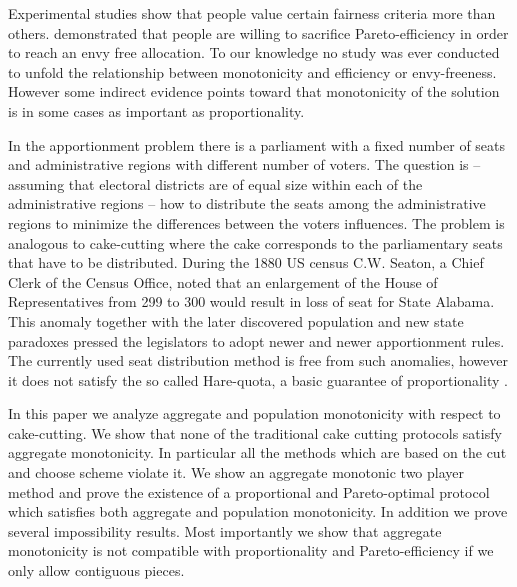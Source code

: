 \documentclass[a4paper,12pt]{article}
\begin{document}
Experimental studies show that people value certain fairness criteria more than others. \cite{Herreiner2009} demonstrated that people are willing to sacrifice Pareto-efficiency in order to reach an envy free allocation. To our knowledge no study was ever conducted to unfold the relationship between monotonicity and efficiency or envy-freeness. However some indirect evidence points toward that monotonicity of the solution is in some cases as important as proportionality. 

In the apportionment problem there is a parliament with a fixed number of seats and administrative regions with different number of voters. The question is -- assuming that electoral districts are of equal size within each of the administrative regions -- how to distribute the seats among the administrative regions to minimize the differences between the voters influences. The problem is analogous to cake-cutting where the cake corresponds to the parliamentary seats that have to be distributed. During the 1880 US census C.W. Seaton, a Chief Clerk of the Census Office, noted that an enlargement of the House of Representatives from 299 to 300 would result in loss of seat for State Alabama. This anomaly together with the later discovered population and new state paradoxes pressed the legislators to adopt newer and newer apportionment rules. The currently used seat distribution method is free from such anomalies, however it does not satisfy the so called Hare-quota, a basic guarantee of proportionality \citep{Balinski1975}.

In this paper we analyze aggregate and population monotonicity with respect to cake-cutting. We show that none of the traditional cake cutting protocols satisfy aggregate monotonicity. In particular all the methods which are based on the cut and choose scheme violate it. We show an aggregate monotonic two player method and prove the existence of a proportional and Pareto-optimal protocol which satisfies both aggregate and population monotonicity. In addition we prove several impossibility results. Most importantly we show that aggregate monotonicity is not compatible with proportionality and Pareto-efficiency if we only allow contiguous pieces.  


\end{document}
